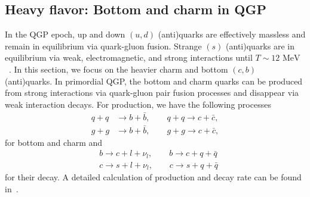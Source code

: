 \documentclass[universe,article,submit,moreauthors,pdftex,a4paper]{Definitions/mdpi}
\newcommand{\MeV}{\text{ MeV}}
\begin{document}
\subsection{Heavy flavor: Bottom and charm in QGP}\label{sec:BottomCharm}
\noindent In the QGP epoch, up and down $(u,d)$ (anti)quarks are effectively massless and remain in equilibrium via quark-gluon fusion. Strange $(s)$ (anti)quarks are in equilibrium via weak, electromagnetic, and strong interactions until $T\sim12\MeV$~\cite{Yang:2021bko}. In this section, we focus on the heavier charm and bottom $(c,b)$ (anti)quarks. In primordial QGP, the bottom and charm quarks can be produced from strong interactions via quark-gluon pair fusion processes and disappear via weak interaction decays. For production, we have the following processes
\begin{align}
 q+q&\longrightarrow b+\bar b,\qquad q+q\longrightarrow c+\bar c,\\
 g+g&\longrightarrow b+\bar b,\qquad g+g\longrightarrow c+\bar c,
\end{align}
for bottom and charm and 
\begin{align}
 &b\longrightarrow c+l+\nu_l, \qquad b\longrightarrow c+q+\bar{q}\\
&c\longrightarrow s+l+\nu_l,\qquad c\longrightarrow s+q+\bar{q}
\end{align}
for their decay. A detailed calculation of production and decay rate can be found in~\cite{Yang:2020nne}.
\end{document}
